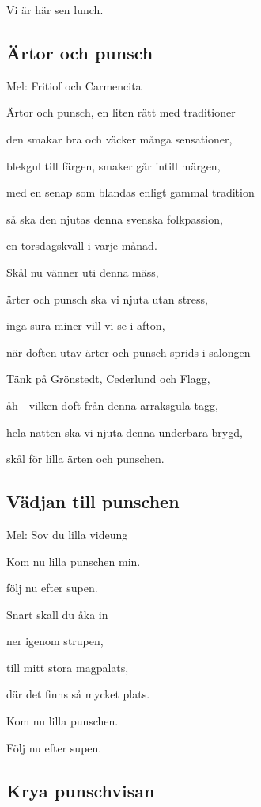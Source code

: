 Vi är här sen lunch.

\subsection{\textbf{Ärtor och punsch}}

Mel: Fritiof och Carmencita\bigskip

Ärtor och punsch, en liten rätt med traditioner

den smakar bra och väcker många sensationer,

blekgul till färgen, smaker går intill märgen,

med en senap som blandas enligt gammal tradition

så ska den njutas denna svenska folkpassion,

en torsdagskväll i varje månad.\bigskip

Skål nu vänner uti denna mäss,

ärter och punsch ska vi njuta utan stress,

inga sura miner vill vi se i afton,

när doften utav ärter och punsch sprids i salongen

Tänk på Grönstedt, Cederlund och Flagg,

åh - vilken doft från denna arraksgula tagg,

hela natten ska vi njuta denna underbara brygd,

skål för lilla ärten och punschen.

\subsection{\textbf{Vädjan till punschen}}

Mel: Sov du lilla videung\bigskip

Kom nu lilla punschen min.

följ nu efter supen.

Snart skall du åka in

ner igenom strupen,

till mitt stora magpalats,

där det finns så mycket plats.

Kom nu lilla punschen.

Följ nu efter supen.

\subsection{\textbf{Krya punschvisan}}

